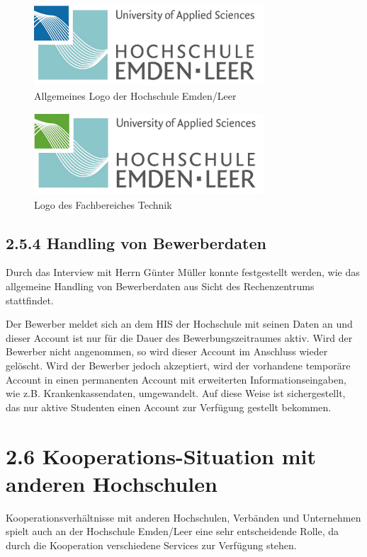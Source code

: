 \documentclass[a4paper]{article}
\begin{document}
\begin{figure}
\centering
\includegraphics[width=8.58cm,height=3.039cm]{EntwurfKapitel2Gruppe220150528VW-img/EntwurfKapitel2Gruppe220150528VW-img008.png}
\caption[Allgemeines Logo der Hochschule Emden/Leer]{Allgemeines Logo der Hochschule Emden/Leer}

\end{figure}
\begin{figure}
\centering
\includegraphics[width=8.576cm,height=3.044cm]{EntwurfKapitel2Gruppe220150528VW-img/EntwurfKapitel2Gruppe220150528VW-img009.png}
\caption[Logo des Fachbereiches Technik]{Logo des Fachbereiches Technik}

\end{figure}
\subsection[2.5.4 Handling von Bewerberdaten]{\bfseries 2.5.4 Handling von Bewerberdaten}
{\sffamily\mdseries\color{black}
Durch das Interview mit Herrn Günter Müller konnte festgestellt werden, wie das allgemeine Handling von Bewerberdaten
aus Sicht des Rechenzentrums stattfindet. }

{\sffamily\mdseries\color{black}
Der Bewerber meldet sich an dem HIS der Hochschule mit seinen Daten an und dieser Account ist nur für die Dauer des
Bewerbungszeitraumes aktiv. Wird der Bewerber nicht angenommen, so wird dieser Account im Anschluss wieder gelöscht.
Wird der Bewerber jedoch akzeptiert, wird der vorhandene temporäre Account in einen permanenten Account mit erweiterten
Informationseingaben, wie z.B. Krankenkassendaten, umgewandelt. Auf diese Weise ist sichergestellt, das nur aktive
Studenten einen Account zur Verfügung gestellt bekommen. }

\section{2.6 Kooperations-Situation mit anderen Hochschulen}
{\sffamily\mdseries\color{black}
Kooperationsverhältnisse mit anderen Hochschulen, Verbänden und Unternehmen spielt auch an der Hochschule Emden/Leer
eine sehr entscheidende Rolle, da durch die Kooperation verschiedene Services zur Verfügung stehen.}
\end{document}

